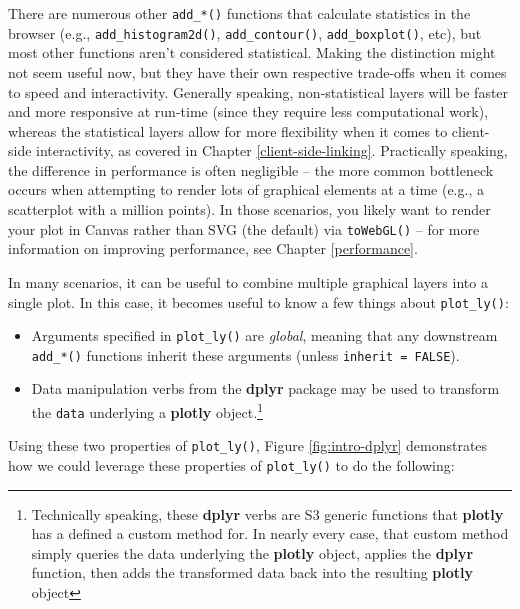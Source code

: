 \documentclass[
  12pt,
]{krantz}
\providecommand{\tightlist}{%
  \setlength{\itemsep}{0pt}\setlength{\parskip}{0pt}}
\begin{document}
There are numerous other \texttt{add\_*()} functions that calculate statistics in the browser (e.g., \texttt{add\_histogram2d()}, \texttt{add\_contour()}, \texttt{add\_boxplot()}, etc), but most other functions aren't considered statistical. Making the distinction might not seem useful now, but they have their own respective trade-offs when it comes to speed and interactivity. Generally speaking, non-statistical layers will be faster and more responsive at run-time (since they require less computational work), whereas the statistical layers allow for more flexibility when it comes to client-side interactivity, as covered in Chapter \ref{client-side-linking}. Practically speaking, the difference in performance is often negligible -- the more common bottleneck occurs when attempting to render lots of graphical elements at a time (e.g., a scatterplot with a million points). In those scenarios, you likely want to render your plot in Canvas rather than SVG (the default) via \texttt{toWebGL()} -- for more information on improving performance, see Chapter \ref{performance}.


In many scenarios, it can be useful to combine multiple graphical layers into a single plot. In this case, it becomes useful to know a few things about \texttt{plot\_ly()}:

\begin{itemize}
\tightlist
\item
  Arguments specified in \texttt{plot\_ly()} are \emph{global}, meaning that any downstream \texttt{add\_*()} functions inherit these arguments (unless \texttt{inherit\ =\ FALSE}).
\item
  Data manipulation verbs from the \textbf{dplyr} package may be used to transform the \texttt{data} underlying a \textbf{plotly} object.\footnote{Technically speaking, these \textbf{dplyr} verbs are S3 generic functions that \textbf{plotly} has a defined a custom method for. In nearly every case, that custom method simply queries the data underlying the \textbf{plotly} object, applies the \textbf{dplyr} function, then adds the transformed data back into the resulting \textbf{plotly} object}
\end{itemize}

Using these two properties of \texttt{plot\_ly()}, Figure \ref{fig:intro-dplyr} demonstrates how we could leverage these properties of \texttt{plot\_ly()} to do the following:
\end{document}
